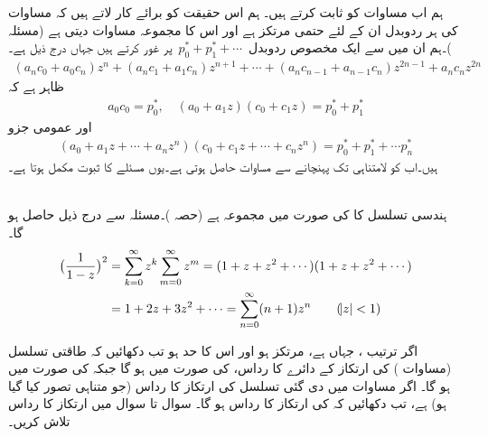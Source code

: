 ہم اب مساوات  کو ثابت کرتے ہیں۔ ہم اس حقیقت کو برائے کار لاتے ہیں کہ مساوات  کی ہر ردوبدل ان  کے لئے حتمی مرتکز ہے اور اس کا مجموعہ مساوات  دیتی ہے (مسئلہ )۔ہم ان میں سے ایک مخصوص ردوبدل 
$\,p^*_0+p^*_1+\cdots\,$
پر غور کرتے ہیں جہاں  درج ذیل ہے۔
\begin{align*}
(a_nc_0+a_0c_n)z^n+(a_nc_1+a_1c_n)z^{n+1}+\cdots+(a_nc_{n-1}+a_{n-1}c_n)z^{2n-1}+a_nc_nz^{2n}
\end{align*}
ظاہر ہے کہ 
\begin{align*}
a_0c_0=p^*_0,\quad (a_0+a_1z)(c_0+c_1z)=p^*_0+p^*_1
\end{align*}
اور عمومی جزو
\begin{align*}
(a_0+a_1z+\cdots+a_nz^n)(c_0+c_1z+\cdots+c_nz^n)=p^*_0+p^*_1+\cdots p^*_n
\end{align*}
ہیں۔اب  کو لامتناہی تک پہنچانے سے  مساوات  حاصل ہوتی ہے۔یوں مسئلے کا ثبوت مکمل ہوتا ہے۔

\quad {}\\
ہندسی تسلسل  کا  کی صورت میں مجموعہ  ہے (حصہ )۔مسئلہ  سے درج ذیل حاصل ہو گا۔
\begin{align*}
\big(\frac{1}{1-z}\big)^2&=\sum\limits_{k=0}^{\infty} z^k\sum\limits_{m=0}^{\infty} z^m=(1+z+z^2+\cdots)(1+z+z^2+\cdots)\\
&=1+2z+3z^2+\cdots=\sum\limits_{n=0}^{\infty}(n+1)z^n\quad \quad (\abs{z}<1)
\end{align*}

\quad
اگر ترتیب ، جہاں  ہے، مرتکز ہو اور اس کا حد  ہو تب دکھائیں کہ طاقتی تسلسل (مساوات ) کی ارتکاز کے دائرے کا رداس،  کی صورت میں   ہو گا جبکہ  کی صورت میں  ہو گا۔
\quad
اگر مساوات  میں دی گئی تسلسل کی ارتکاز کا رداس (جو متناہی تصور  کیا گیا ہو)  ہے، تب دکھائیں کہ  کی ارتکاز کا رداس  ہو گا۔
سوال  تا سوال  میں ارتکاز کا رداس تلاش کریں۔

